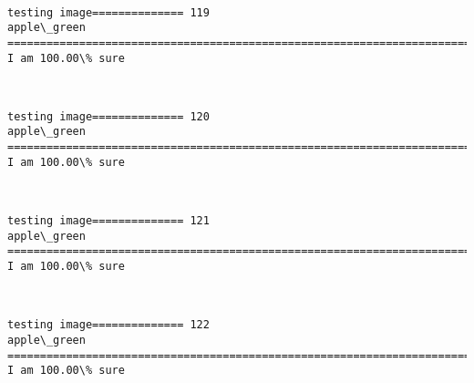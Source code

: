 \documentclass[11pt]{article}
\begin{document}
    \begin{center}
    \end{center}
    { \hspace*{\fill} \\}
    
    \begin{Verbatim}[commandchars=\\\{\}]
testing image============== 119
apple\_green
============================================================================
I am 100.00\% sure

    \end{Verbatim}

    \begin{center}
    \end{center}
    { \hspace*{\fill} \\}
    
    \begin{Verbatim}[commandchars=\\\{\}]
testing image============== 120
apple\_green
============================================================================
I am 100.00\% sure

    \end{Verbatim}

    \begin{center}
    \end{center}
    { \hspace*{\fill} \\}
    
    \begin{Verbatim}[commandchars=\\\{\}]
testing image============== 121
apple\_green
============================================================================
I am 100.00\% sure

    \end{Verbatim}

    \begin{center}
    \end{center}
    { \hspace*{\fill} \\}
    
    \begin{Verbatim}[commandchars=\\\{\}]
testing image============== 122
apple\_green
============================================================================
I am 100.00\% sure

    \end{Verbatim}
\end{document}
